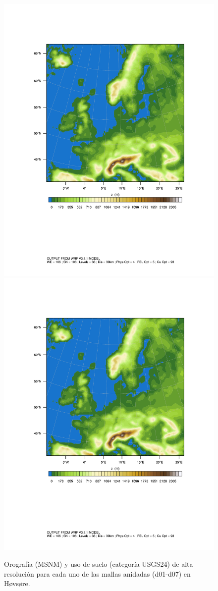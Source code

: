 \begin{figure}[H]
	\bigskip
	\includegraphics[width=0.25\linewidth,page=13,trim={2cm 6.5cm 1cm 3.5cm},clip]{Imagenes/05/hov_domain.pdf}%
	\includegraphics[width=0.25\linewidth,page=14,trim={2cm 6.5cm 1cm 3.5cm},clip]{Imagenes/05/hov_domain.pdf}%
	
	\caption{Orografía (MSNM) y uso de suelo (categoría USGS24) de alta resolución para cada uno de las mallas anidadas (d01-d07) en Høvsøre.}
	\label{fig:dominios_hov}
\end{figure}
\vspace*{\fill}
\newpage
\vspace*{\fill}
